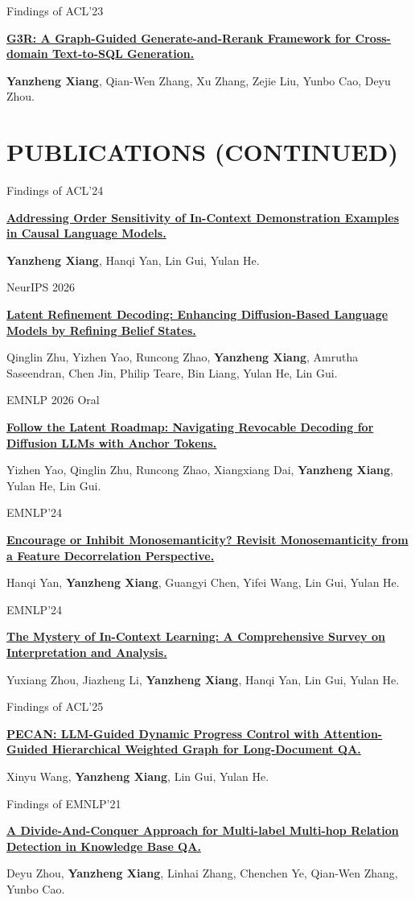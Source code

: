 \documentclass[UTF8,11pt,a4paper,fontset=none]{ctexart}
\newcommand{\pubentry}[4]{%
  \noindent
  \begin{minipage}[t]{0.19\textwidth}
    \vspace{0pt}\raggedright{\footnotesize\sffamily\color{muted}#1}
  \end{minipage}\hfill
  \begin{minipage}[t]{0.78\textwidth}
    \vspace{0pt}\raggedright
    {\small\bfseries\href{#4}{#3}}\par
    {\footnotesize\color{muted}#2}\par
  \end{minipage}\par\vspace{0.35em}%
}
\begin{document}
\pubentry{Findings of ACL'23}
  {\textbf{Yanzheng Xiang}, Qian-Wen Zhang, Xu Zhang, Zejie Liu, Yunbo Cao, Deyu Zhou.}
  {G3R: A Graph-Guided Generate-and-Rerank Framework for Cross-domain Text-to-SQL Generation.}
  {https://aclanthology.org/2023.findings-acl.23/}

\newpage
\section*{PUBLICATIONS (CONTINUED)}
\pubentry{Findings of ACL'24}
  {\textbf{Yanzheng Xiang}, Hanqi Yan, Lin Gui, Yulan He.}
  {Addressing Order Sensitivity of In-Context Demonstration Examples in Causal Language Models.}
  {https://arxiv.org/abs/2402.15637}

\pubentry{NeurIPS 2026}
  {Qinglin Zhu, Yizhen Yao, Runcong Zhao, \textbf{Yanzheng Xiang}, Amrutha Saseendran, Chen Jin, Philip Teare, Bin Liang, Yulan He, Lin Gui.}
  {Latent Refinement Decoding: Enhancing Diffusion-Based Language Models by Refining Belief States.}
  {https://arxiv.org/abs/2510.11052}

\pubentry{EMNLP 2026 Oral}
  {Yizhen Yao, Qinglin Zhu, Runcong Zhao, Xiangxiang Dai, \textbf{Yanzheng Xiang}, Yulan He, Lin Gui.}
  {Follow the Latent Roadmap: Navigating Revocable Decoding for Diffusion LLMs with Anchor Tokens.}
  {https://arxiv.org/abs/2606.16847}

\pubentry{EMNLP'24}
  {Hanqi Yan, \textbf{Yanzheng Xiang}, Guangyi Chen, Yifei Wang, Lin Gui, Yulan He.}
  {Encourage or Inhibit Monosemanticity? Revisit Monosemanticity from a Feature Decorrelation Perspective.}
  {https://arxiv.org/abs/2406.17969}

\pubentry{EMNLP'24}
  {Yuxiang Zhou, Jiazheng Li, \textbf{Yanzheng Xiang}, Hanqi Yan, Lin Gui, Yulan He.}
  {The Mystery of In-Context Learning: A Comprehensive Survey on Interpretation and Analysis.}
  {https://arxiv.org/abs/2311.00237}

\pubentry{Findings of ACL'25}
  {Xinyu Wang, \textbf{Yanzheng Xiang}, Lin Gui, Yulan He.}
  {PECAN: LLM-Guided Dynamic Progress Control with Attention-Guided Hierarchical Weighted Graph for Long-Document QA.}
  {https://arxiv.org/abs/2410.04790}

\pubentry{Findings of EMNLP'21}
  {Deyu Zhou, \textbf{Yanzheng Xiang}, Linhai Zhang, Chenchen Ye, Qian-Wen Zhang, Yunbo Cao.}
  {A Divide-And-Conquer Approach for Multi-label Multi-hop Relation Detection in Knowledge Base QA.}
  {https://aclanthology.org/2021.findings-emnlp.412/}
\end{document}
